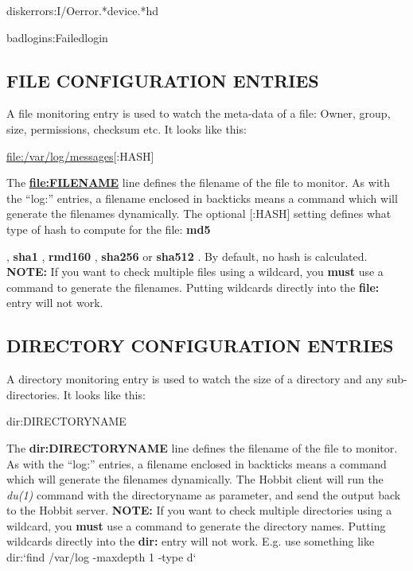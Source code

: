diskerrors:I/Oerror.*device.*hd  
 
badlogins:Failedlogin 


 


 
\subsection{FILE CONFIGURATION ENTRIES}
 A file monitoring entry is used to watch the meta-data of a file:
 Owner, group, size, permissions, checksum etc. It looks like this: 


  
\url{file:/var/log/messages}[:HASH] 


  The \textbf{\url{file:FILENAME}}
 line defines the filename of the file to monitor. As with the
 ``log:'' entries, a filename enclosed in backticks means a command
 which will generate the filenames dynamically. The optional [:HASH]
 setting defines what type of hash to compute for the file:
 \textbf{md5}

, \textbf{sha1}
, \textbf{rmd160}
, \textbf{sha256}
 or \textbf{sha512}
. By default, no hash is calculated.  
\textbf{NOTE:}
 If you want to check multiple files using a wildcard, you \textbf{must}
 use a command to generate the filenames. Putting wildcards directly into the \textbf{file:}
 entry will not work. 


 
\subsection{DIRECTORY CONFIGURATION ENTRIES}
 A directory monitoring entry is used to watch the size of a directory and any sub-directories. It looks like this: 

  
dir:DIRECTORYNAME 


  The \textbf{dir:DIRECTORYNAME}
 line defines the filename of the file to monitor. As with the ``log:'' entries, a filename enclosed in backticks means a command which will generate the filenames dynamically. The Hobbit client will run the \emph{du(1)}
 command with the directoryname as parameter, and send the output back to the Hobbit server.  
\textbf{NOTE:}
 If you want to check multiple directories using a wildcard, you \textbf{must}
 use a command to generate the directory names. Putting wildcards directly into the \textbf{dir:}
 entry will not work. E.g. use something like  
dir:`find /var/log -maxdepth 1 -type d` 




